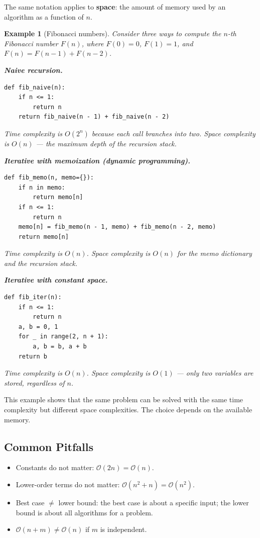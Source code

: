\documentclass[11pt,a4paper]{article}
\newtheorem{example}[theorem]{Example}
\newcommand{\bigO}{\mathcal{O}}
\begin{document}
The same notation applies to \textbf{space}: the amount of memory used by an algorithm as a function of $n$.

\begin{example}[Fibonacci numbers]
Consider three ways to compute the $n$-th Fibonacci number $F(n)$, where $F(0)=0$, $F(1)=1$, and $F(n) = F(n-1) + F(n-2)$.

\textbf{Naive recursion.}
\begin{lstlisting}
def fib_naive(n):
    if n <= 1:
        return n
    return fib_naive(n - 1) + fib_naive(n - 2)
\end{lstlisting}
Time complexity is $O(2^n)$ because each call branches into two. Space complexity is $O(n)$ --- the maximum depth of the recursion stack.

\textbf{Iterative with memoization (dynamic programming).}
\begin{lstlisting}
def fib_memo(n, memo={}):
    if n in memo:
        return memo[n]
    if n <= 1:
        return n
    memo[n] = fib_memo(n - 1, memo) + fib_memo(n - 2, memo)
    return memo[n]
\end{lstlisting}
Time complexity is $O(n)$. Space complexity is $O(n)$ for the memo dictionary and the recursion stack.

\textbf{Iterative with constant space.}
\begin{lstlisting}
def fib_iter(n):
    if n <= 1:
        return n
    a, b = 0, 1
    for _ in range(2, n + 1):
        a, b = b, a + b
    return b
\end{lstlisting}
Time complexity is $O(n)$. Space complexity is $O(1)$ --- only two variables are stored, regardless of $n$.
\end{example}

This example shows that the same problem can be solved with the same time complexity but different space complexities. The choice depends on the available memory.

\subsection{Common Pitfalls}

\begin{itemize}
    \item Constants do not matter: $\bigO(2n) = \bigO(n)$.
    \item Lower-order terms do not matter: $\bigO(n^2 + n) = \bigO(n^2)$.
    \item Best case $\neq$ lower bound: the best case is about a specific input; the lower bound is about all algorithms for a problem.
    \item $\bigO(n + m) \neq \bigO(n)$ if $m$ is independent.
\end{itemize}
\end{document}
